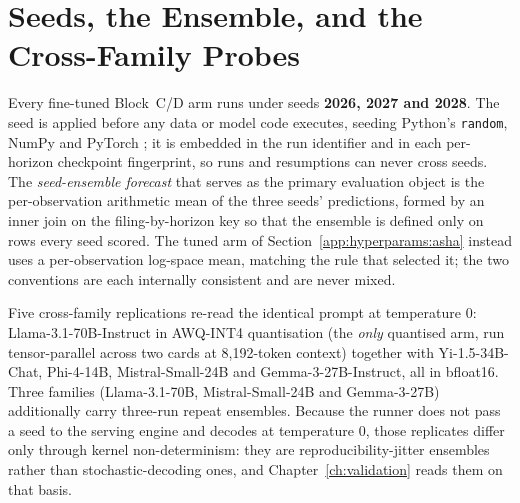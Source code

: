 \FloatBarrier
\section{Seeds, the Ensemble, and the Cross-Family Probes}
\label{app:hyperparams:seeds}

Every fine-tuned Block~C/D arm runs under seeds \textbf{2026, 2027 and 2028}. The
seed is applied before any data or model code executes, seeding Python's
\texttt{random}, NumPy and PyTorch \cite{paszke2019pytorch}; it is embedded in the
run identifier and in each per-horizon checkpoint fingerprint, so runs and
resumptions can never cross seeds. %
The \emph{seed-ensemble forecast} that serves as the primary evaluation object is
the per-observation arithmetic mean of the three seeds' predictions, formed by an
inner join on the filing-by-horizon key so that the ensemble is defined only on
rows every seed scored. %
The tuned arm of Section~\ref{app:hyperparams:asha} instead uses a per-observation
log-space mean, matching the rule that selected it; the two conventions are each
internally consistent and are never mixed.

Five cross-family replications re-read the identical prompt at temperature 0:
Llama-3.1-70B-Instruct in AWQ-INT4 quantisation (the \emph{only} quantised arm,
run tensor-parallel across two cards at 8{,}192-token context) together with
Yi-1.5-34B-Chat, Phi-4-14B, Mistral-Small-24B and Gemma-3-27B-Instruct, all in
bfloat16. %
Three families (Llama-3.1-70B, Mistral-Small-24B and Gemma-3-27B) additionally carry three-run repeat ensembles. Because the runner
does not pass a seed to the serving engine and decodes at temperature 0, those
replicates differ only through kernel non-determinism: they are
reproducibility-jitter ensembles rather than stochastic-decoding ones, and
Chapter~\ref{ch:validation} reads them on that basis. %

